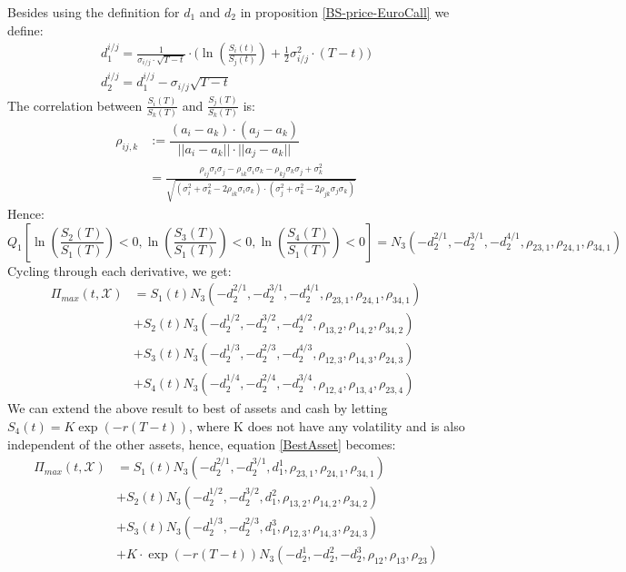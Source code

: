 Besides using the definition for $d_1$ and $d_2$ in proposition \ref{BS-price-EuroCall} we define:
\begin{align*}
d^{i/j}_1 =\frac{1}{\sigma_{i/j}\cdot \sqrt{T-t}} \cdot \bigg( \ln(\frac{S_i(t)}{S_j(t)}) + \frac{1}{2} \sigma_{i/j}^2 \cdot (T-t) \bigg)\\
d^{i/j}_2=d^{i/j}_1-\sigma_{i/j} \sqrt{T-t}
\end{align*}
The correlation between $\frac{S_i(T)}{S_k(T)}$ and $\frac{S_j(T)}{S_k(T)}$ is:
\begin{align*}
\rho_{ij,k}&:= \dfrac{(a_i-a_k)\cdot(a_j-a_k)}{||a_i-a_k|| \cdot ||a_j-a_k||}\\
&=\frac{\rho_{ij}\sigma_i \sigma_j - \rho_{ik}\sigma_i \sigma_k - \rho_{kj}\sigma_k \sigma_j + \sigma_k^2}{\sqrt{(\sigma_i^2 + \sigma_k^2 - 2\rho_{ik}\sigma_i \sigma_k)\cdot(\sigma_j^2 + \sigma_k^2 - 2\rho_{jk}\sigma_j \sigma_k)}}
\end{align*}
Hence:
$$Q_1[\ln(\frac{S_2(T)}{S_1(T)})<0, \ln(\frac{S_3(T)}{S_1(T)})<0, \ln(\frac{S_4(T)}{S_1(T)})<0]=N_3(-d_2^{2/1},-d_2^{3/1},-d_2^{4/1}, \rho_{23,1}, \rho_{24,1}, \rho_{34,1})$$
Cycling through each derivative, we get:
\begin{equation}\label{BestAsset}
\begin{split}
\Pi_{max}(t,\mathcal{X})&=S_1(t) N_3(-d_2^{2/1},-d_2^{3/1},-d_2^{4/1}, \rho_{23,1}, \rho_{24,1}, \rho_{34,1}) \\
&+S_2(t) N_3(-d_2^{1/2},-d_2^{3/2},-d_2^{4/2}, \rho_{13,2}, \rho_{14,2}, \rho_{34,2})\\
&+S_3(t) N_3(-d_2^{1/3},-d_2^{2/3},-d_2^{4/3}, \rho_{12,3}, \rho_{14,3}, \rho_{24,3}) \\
&+S_4(t) N_3(-d_2^{1/4},-d_2^{2/4},-d_2^{3/4}, \rho_{12,4}, \rho_{13,4}, \rho_{23,4})
\end{split}
\end{equation}
We can extend the above result to best of assets and cash by letting $S_4(t)=K\exp(-r(T-t))$, where K does not have any volatility and is also independent of the other assets, hence, equation \eqref{BestAsset} becomes:
\begin{equation}\label{BestAssetOrCash}
\begin{split}
\Pi_{max}(t,\mathcal{X})&=S_1(t) N_3(-d_2^{2/1},-d_2^{3/1},d_1^{1}, \rho_{23,1}, \rho_{24,1}, \rho_{34,1}) \\
&+S_2(t) N_3(-d_2^{1/2},-d_2^{3/2},d_1^{2}, \rho_{13,2}, \rho_{14,2}, \rho_{34,2})\\
&+S_3(t) N_3(-d_2^{1/3},-d_2^{2/3},d_1^{3}, \rho_{12,3}, \rho_{14,3}, \rho_{24,3}) \\
&+K\cdot \exp(-r(T-t)) N_3(-d_2^1,-d_2^2,-d_2^3, \rho_{12}, \rho_{13}, \rho_{23})
\end{split}
\end{equation}

